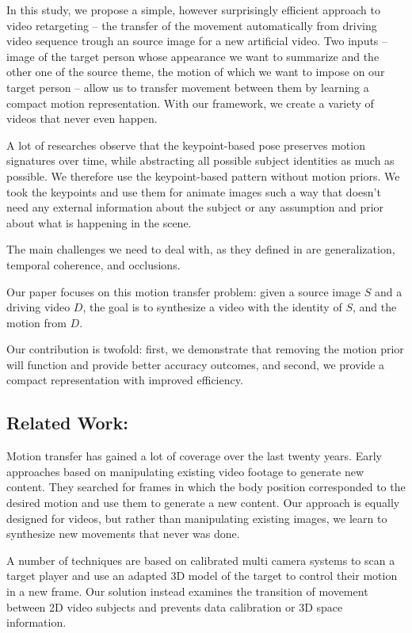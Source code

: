 \documentclass{article}
\begin{document}
In this study, we propose a simple, however surprisingly efficient approach
to video retargeting – the transfer of the movement automatically from
driving video sequence trough an source image for a new artificial video.
Two inputs – image of the target person whose appearance we want to
summarize and the other one of the source theme, the motion of which we want
to impose on our target person – allow us to transfer movement between them
by learning a compact motion representation.
With our framework, we create a variety of videos that never even happen.

A lot of researches observe that the keypoint-based pose preserves motion
signatures over time, while abstracting all possible subject identities as
much as possible. We therefore use the keypoint-based pattern without motion
priors. We took the keypoints and use them for animate images such a way
that doesn't need any external information about the subject or any
assumption and prior about what is happening in the scene.

The main challenges we need to deal with, as they defined in  \cite{Mirsky_2021} are generalization, temporal coherence, and occlusions.

Our paper focuses on this motion transfer problem: given a source image $S$
and a driving video $D$, the goal is to synthesize a video with the identity
of $S$, and the motion from $D$.

Our contribution is twofold: first, we demonstrate that removing the motion prior will function and provide better accuracy outcomes, and second, we provide a compact representation with improved efficiency.

\medskip

\subsection{Related Work:}
Motion transfer has gained a lot of coverage over the last twenty years.
Early approaches based on manipulating existing video footage to generate
new content. They searched for frames in which the body position
corresponded to the desired motion and use them to generate a new
content\cite{bregler1997video}. Our approach is equally designed for videos,
but rather than manipulating existing images, we learn to synthesize new
movements that never was done.

A number of techniques are based on calibrated multi camera systems to scan
a target player and use an adapted 3D model of the target to control their
motion in a new frame\cite{cheung2004markerless}. Our solution instead
examines the transition of movement between 2D video subjects and prevents
data calibration or 3D space information.
\end{document}
